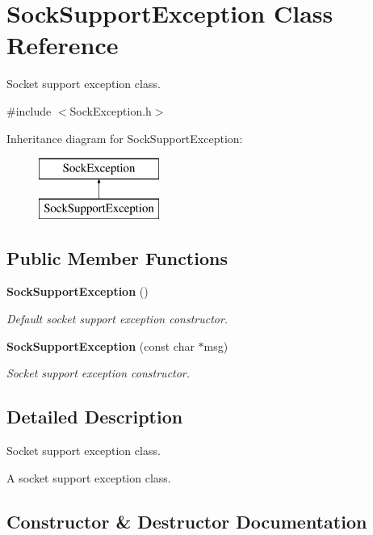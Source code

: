 \section{\-Sock\-Support\-Exception \-Class \-Reference}
\label{classSockSupportException}


\-Socket support exception class.  




{\ttfamily \#include $<$\-Sock\-Exception.\-h$>$}

\-Inheritance diagram for \-Sock\-Support\-Exception\-:\begin{figure}[H]
\begin{center}
\leavevmode
\includegraphics[height=2.000000cm]{classSockSupportException}
\end{center}
\end{figure}
\subsection*{\-Public \-Member \-Functions}
\begin{DoxyCompactItemize}
\item 
{\bf \-Sock\-Support\-Exception} ()
\begin{DoxyCompactList}\small\item\em \-Default socket support exception constructor. \end{DoxyCompactList}\item 
{\bf \-Sock\-Support\-Exception} (const char $\ast$msg)
\begin{DoxyCompactList}\small\item\em \-Socket support exception constructor. \end{DoxyCompactList}\end{DoxyCompactItemize}


\subsection{\-Detailed \-Description}
\-Socket support exception class. 

\-A socket support exception class. 

\subsection{\-Constructor \& \-Destructor \-Documentation}

